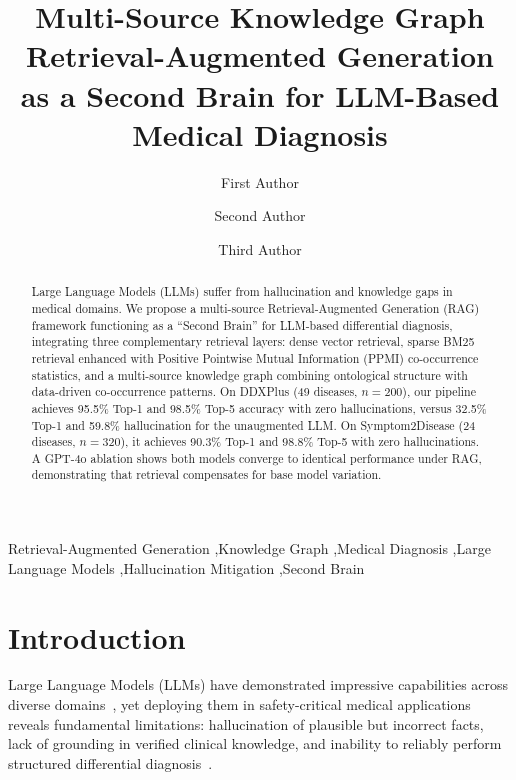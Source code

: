 \documentclass[preprint,12pt]{elsarticle}
\begin{document}
\begin{frontmatter}

\title{Multi-Source Knowledge Graph Retrieval-Augmented Generation\\as a Second Brain for LLM-Based Medical Diagnosis}

\author[addr1]{First Author}
\author[addr1]{Second Author}
\author[addr1]{Third Author}

\address[addr1]{Department of Computer Science, University, Country}

\begin{abstract}
Large Language Models (LLMs) suffer from hallucination and knowledge gaps in medical domains. We propose a multi-source Retrieval-Augmented Generation (RAG) framework functioning as a ``Second Brain'' for LLM-based differential diagnosis, integrating three complementary retrieval layers: dense vector retrieval, sparse BM25 retrieval enhanced with Positive Pointwise Mutual Information (PPMI) co-occurrence statistics, and a multi-source knowledge graph combining ontological structure with data-driven co-occurrence patterns. On DDXPlus (49 diseases, $n{=}200$), our pipeline achieves 95.5\% Top-1 and 98.5\% Top-5 accuracy with zero hallucinations, versus 32.5\% Top-1 and 59.8\% hallucination for the unaugmented LLM. On Symptom2Disease (24 diseases, $n{=}320$), it achieves 90.3\% Top-1 and 98.8\% Top-5 with zero hallucinations. A GPT-4o ablation shows both models converge to identical performance under RAG, demonstrating that retrieval compensates for base model variation.
\end{abstract}

\begin{keyword}
Retrieval-Augmented Generation \sep Knowledge Graph \sep Medical Diagnosis \sep Large Language Models \sep Hallucination Mitigation \sep Second Brain
\end{keyword}

\end{frontmatter}

\section{Introduction}
\label{sec:introduction}

Large Language Models (LLMs) have demonstrated impressive capabilities across diverse domains~\cite{brown2020language,openai2023gpt4}, yet deploying them in safety-critical medical applications reveals fundamental limitations: hallucination of plausible but incorrect facts, lack of grounding in verified clinical knowledge, and inability to reliably perform structured differential diagnosis~\cite{ji2023survey,singhal2023large}.
\end{document}
